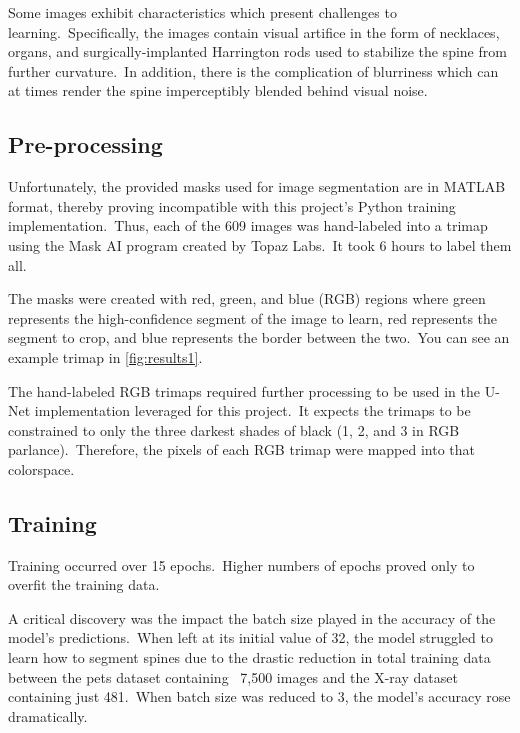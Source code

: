 \documentclass[conference]{IEEEtran}
\begin{document}
    Some images exhibit characteristics which present challenges to learning.\ Specifically, the images contain visual artifice in the form of necklaces, organs, and surgically-implanted Harrington rods used to stabilize the spine from further curvature.\ In addition, there is the complication of blurriness which can at times render the spine imperceptibly blended behind visual noise.

    \subsection{Pre-processing}\label{subsec:pre-processing}

    Unfortunately, the provided masks used for image segmentation are in MATLAB format, thereby proving incompatible with this project's Python training implementation.\ Thus, each of the 609 images was hand-labeled into a trimap~\cite{create-trimaps-with-topaz-mask-ai} using the Mask AI program created by Topaz Labs.\ It took 6 hours to label them all.

    The masks were created with red, green, and blue (RGB) regions where green represents the high-confidence segment of the image to learn, red represents the segment to crop, and blue represents the border between the two.\ You can see an example trimap in \autoref{fig:results1}.

    The hand-labeled RGB trimaps required further processing to be used in the U-Net implementation leveraged for this project.\ It expects the trimaps to be constrained to only the three darkest shades of black (1, 2, and 3 in RGB parlance).\ Therefore, the pixels of each RGB trimap were mapped into that colorspace.

    \subsection{Training}\label{subsec:training}

    Training occurred over 15 epochs.\ Higher numbers of epochs proved only to overfit the training data.

    A critical discovery was the impact the batch size played in the accuracy of the model's predictions.\ When left at its initial value of 32, the model struggled to learn how to segment spines due to the drastic reduction in total training data between the pets dataset containing ~7,500 images and the X-ray dataset containing just 481.\ When batch size was reduced to 3, the model's accuracy rose dramatically.
\end{document}
